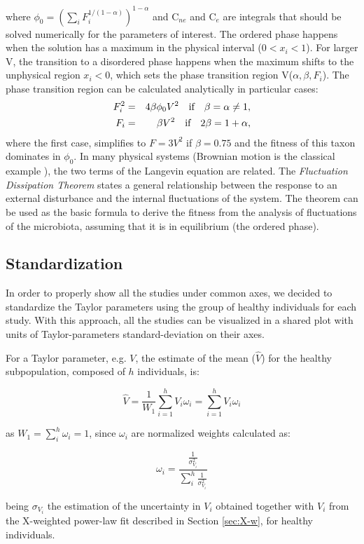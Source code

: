 where $\phi_0 = (\sum_i F_i^{1/(1-\alpha)})^{1-\alpha}$ and C$_{ne}$ and C$_{e}$ are integrals that should be solved numerically for the parameters of interest. The ordered phase happens when the solution has a maximum in the physical interval ($0<x_i<1$). For larger V, the transition to a disordered phase happens when the maximum shifts to the unphysical region $x_i<0$, which sets the phase transition region V($\alpha,\beta,F_i$). The phase transition region can be calculated analytically in particular cases:
\begin{eqnarray}
F_i^2 &=& 4 \beta \phi_0 V^2\quad \textrm{if} \quad  \beta = \alpha \neq 1, \notag \\
F_i &=& \beta V^2\quad \textrm{if} \quad  2\beta = 1+\alpha,
\notag
\end{eqnarray}
where the first case, simplifies to $F= 3 V^2$ if $\beta = 0.75$ and the fitness of this taxon dominates in $\phi_0$. 
In many physical systems (Brownian motion is the classical example \cite{Einstein}), the two terms of the Langevin equation are related.  The \emph{Fluctuation Dissipation Theorem} states a general relationship between the response to an external disturbance and the internal fluctuations of the system\cite{FD}. The theorem can be used as the basic formula to derive the fitness from the analysis of fluctuations 
of the microbiota, assuming that it is in equilibrium (the ordered phase).  

\subsection*{Standardization} \label{sec:stan}
In order to properly show all the studies under common axes, we decided to standardize the Taylor parameters using the group of healthy individuals for each study. With this approach, all the studies can be visualized in a shared plot with units of Taylor-parameters standard-deviation on their axes.

For a Taylor parameter, e.g. $V$, the estimate of the mean ($\widehat{V}$) for the healthy subpopulation, composed of $h$ individuals, is:
\begin{linenomath}
$$\widehat{V} = \frac{1}{W_1}\sum_{i=1}^h V_i \omega_i=\sum_{i=1}^h V_i \omega_i$$
\end{linenomath}
as $W_1=\sum_i^h \omega_i=1$, since $\omega_i$ are normalized weights calculated as:
\begin{linenomath}
$$\omega_i = \frac{\frac{1}{\sigma^2_{V_i}}}{\sum_i^h\frac{1}{\sigma^2_{V_i}}}$$
\end{linenomath}
being $\sigma_{V_i}$ the estimation of the uncertainty in $V_i$ obtained together with $V_i$ from the X-weighted power-law fit described in Section \ref{sec:X-w}, for healthy individuals.

